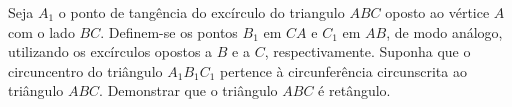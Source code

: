 Seja $A_1$ o ponto de tangência do excírculo do triangulo $ABC$ oposto ao vértice $A$ com o lado $BC$.
Definem-se os pontos $B_1$ em $CA$ e $C_1$ em $AB$, de modo análogo, utilizando os excírculos opostos a $B$ e a $C$, respectivamente.
Suponha que o circuncentro do triângulo $A_1B_1C_1$ pertence à circunferência circunscrita ao triângulo $ABC$.
Demonstrar que o triângulo $ABC$ é retângulo.
